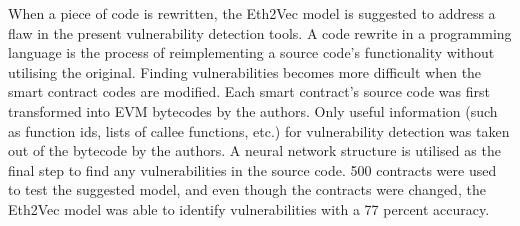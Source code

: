 When a piece of code is rewritten, the Eth2Vec model is suggested to address a flaw in the present vulnerability detection tools. A code rewrite in a programming language is the process of reimplementing a source code's functionality without utilising the original.
Finding vulnerabilities becomes more difficult when the smart contract codes are modified.
Each smart contract's source code was first transformed into EVM bytecodes by the authors.
Only useful information (such as function ids, lists of callee functions, etc.) for vulnerability detection was taken out of the bytecode by the authors.
A neural network structure is utilised as the final step to find any vulnerabilities in the source code.
500 contracts were used to test the suggested model, and even though the contracts were changed, the Eth2Vec model was able to identify vulnerabilities with a 77 percent accuracy.

